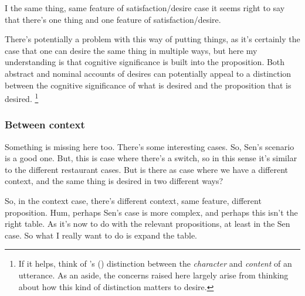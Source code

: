 \documentclass[10pt]{article}
\begin{document}
I the same thing, same feature of satisfaction/desire case it seems right to say that there's one thing and one feature of satisfaction/desire.



There's potentially a problem with this way of putting things, as it's certainly the case that one can desire the same thing in multiple ways, but here my understanding is that cognitive significance is built into the proposition.
Both abstract and nominal accounts of desires can potentially appeal to a distinction between the cognitive significance of what is desired and the proposition that is desired.\nolinebreak
\footnote{If it helps, think of \citeauthor{Kaplan:1989ab}'s (\citeyear{Kaplan:1989ab}) distinction between the \emph{character} and \emph{content} of an utterance.
As an aside, the concerns raised here largely arise from thinking about how this kind of distinction matters to desire.}



\newpage

\subsubsection{Between context}
\label{sec:between-context}


Something is missing here too.
There's some interesting cases.
So, Sen's scenario is a good one.
But, this is case where there's a switch, so in this sense it's similar to the different restaurant cases.
But is there as case where we have a different context, and the same thing is desired in two different ways?

So, in the context case, there's different context, same feature, different proposition.
Hum, perhaps Sen's case is more complex, and perhaps this isn't the right table.
As it's now to do with the relevant propositions, at least in the Sen case.
So what I really want to do is expand the table.


%
\end{document}
